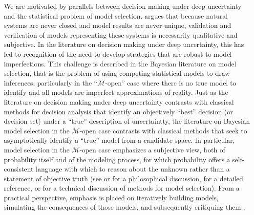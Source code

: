 \documentclass[11pt]{article}
\begin{document}
We are motivated by parallels between decision making under deep uncertainty and the statistical problem of model selection.
\citet{oreskes_verification:1994} argues that because natural systems are never closed and model results are never unique, validation and verification of models representing these systems is necessarily qualitative and subjective.
In the literature on decision making under deep uncertainty, this has led to recognition of the need to develop strategies that are robust to model imperfections.
This challenge is described in the Bayesian literature on model selection, that is the problem of using competing statistical models to draw inferences, particularly in the ``$\mathcal{M}$-open'' case where there is no true model to identify and all models are imperfect approximations of reality.
Just as the literature on decision making under deep uncertainty contrasts with classical methods for decision analysis that identify an objectively ``best'' decision (or decision set) under a ``true'' description of uncertaintty, the literature on Bayesian model selection in the $\mathcal{M}$-open case contrasts with classical methods that seek to asymptotically identify a ``true'' model from a candidate space.
In particular, model selection in the $\mathcal{M}$-open case emphasizes a subjective view, both of probability itself and of the modeling process, for which probability offers a self-consistent language with which to reason about the unknown rather than a statement of objective truth (see \cite{gelman_philosophy:2013} or \cite{ramsey_probability:2016} for a philosophical discussion, \cite{jaynes_probability:2003} for a detailed reference, or \cite{Piironen:2017eh} for a technical discussion of methods for model selection).
From a practical perspective, emphasis is placed on iteratively building models, simulating the consequences of those models, and subsequently critiquing them \citep{gelman_workflow:2020}.
\end{document}
